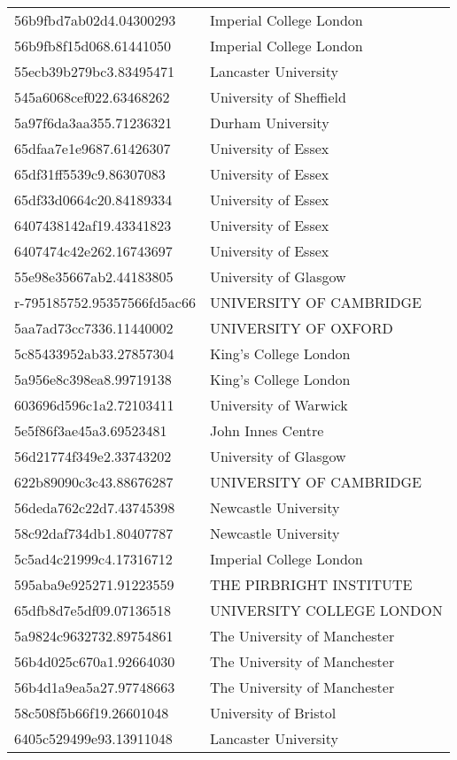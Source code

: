 \begin{tabular}{ll}
56b9fbd7ab02d4.04300293 & Imperial College London \\
56b9fb8f15d068.61441050 & Imperial College London \\
55ecb39b279bc3.83495471 & Lancaster University \\
545a6068cef022.63468262 & University of Sheffield \\
5a97f6da3aa355.71236321 & Durham University \\
65dfaa7e1e9687.61426307 & University of Essex \\
65df31ff5539c9.86307083 & University of Essex \\
65df33d0664c20.84189334 & University of Essex \\
6407438142af19.43341823 & University of Essex \\
6407474c42e262.16743697 & University of Essex \\
55e98e35667ab2.44183805 & University of Glasgow \\
r-795185752.95357566fd5ac66 & UNIVERSITY OF CAMBRIDGE \\
5aa7ad73cc7336.11440002 & UNIVERSITY OF OXFORD \\
5c85433952ab33.27857304 & King's College London \\
5a956e8c398ea8.99719138 & King's College London \\
603696d596c1a2.72103411 & University of Warwick \\
5e5f86f3ae45a3.69523481 & John Innes Centre \\
56d21774f349e2.33743202 & University of Glasgow \\
622b89090c3c43.88676287 & UNIVERSITY OF CAMBRIDGE \\
56deda762c22d7.43745398 & Newcastle University \\
58c92daf734db1.80407787 & Newcastle University \\
5c5ad4c21999c4.17316712 & Imperial College London \\
595aba9e925271.91223559 & THE PIRBRIGHT INSTITUTE \\
65dfb8d7e5df09.07136518 & UNIVERSITY COLLEGE LONDON \\
5a9824c9632732.89754861 & The University of Manchester \\
56b4d025c670a1.92664030 & The University of Manchester \\
56b4d1a9ea5a27.97748663 & The University of Manchester \\
58c508f5b66f19.26601048 & University of Bristol \\
6405c529499e93.13911048 & Lancaster University \\

\end{tabular}
